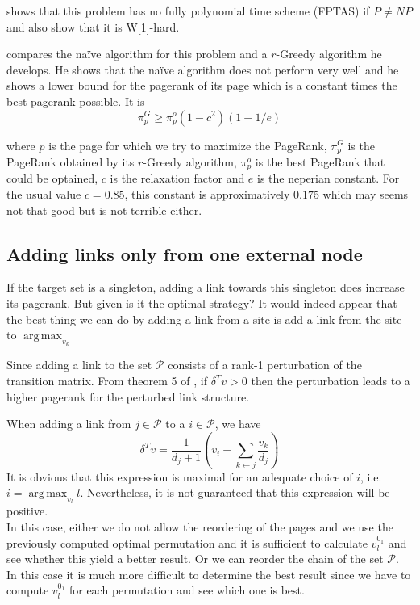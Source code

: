 \documentclass{article}
\DeclareMathOperator*{\argmax}{arg\,max}
\newcommand{\1}{\mathbf{1}}
\theoremstyle{definition}
\begin{document}
\cite{olsen2010maximizing} shows that this problem has no fully polynomial time scheme (FPTAS) if \(P \neq NP\) and also show that it is W[1]-hard.

\cite{olsen2010constant} compares the naïve algorithm for this problem and a \(r\)-Greedy algorithm he develops.
He shows that the naïve algorithm does not perform very well and he shows a lower bound for the pagerank of its page which is a constant times the best pagerank possible. It is
\[ \pi_p^G \geq \pi_p^o(1 - c^2)(1 - 1/e) \]

where \(p\) is the page for which we try to maximize the PageRank,
\(\pi_p^G\) is the PageRank obtained by its \(r\)-Greedy algorithm, \(\pi_p^o\) is the best PageRank that could be optained, \(c\) is the relaxation factor and \(e\) is the neperian constant.
For the usual value \(c = 0.85\), this constant is approximatively \(0.175\) which may seems not that good but is not terrible either.

\subsection{Adding links only from one external node}
If the target set is a singleton, adding a link towards this singleton does increase its pagerank. But given is it the optimal strategy? It would indeed appear that the best thing we can do by adding a link from a site is add a link from the site to \(\argmax_{v_k}\)

Since adding a link to the set \(\mathcal{P}\) consists of a rank-1 perturbation of the transition matrix. From theorem 5 of \cite{de2008maximizing}, if \(\delta^Tv>0\) then the perturbation leads to a higher pagerank for the perturbed link structure.

When adding a link from \(j \in \overline{\mathcal{P}}\) to a \(i \in \mathcal{P}\), we have
\[ \delta^Tv = \frac{1}{d_{j}+1}\left(v_i-\sum_{k\leftarrow j}\frac{v_k}{d_j}\right) \]
It is obvious that this expression is maximal for an adequate choice of \(i\), i.e. \(i = \argmax_{v_l} l\). Nevertheless, it is not guaranteed that this expression will be positive.\\
In this case, either we do not allow the reordering of the pages and we use the previously computed optimal permutation and it is sufficient to calculate \(v^{0_1}_{l}\) and see whether this yield a better result. Or we can reorder the chain of the set \(\mathcal{P}\). In this case it is much more difficult to determine the best result since we have to compute \(v^{0_1}_{l}\) for each permutation and see which one is best.
\end{document}
